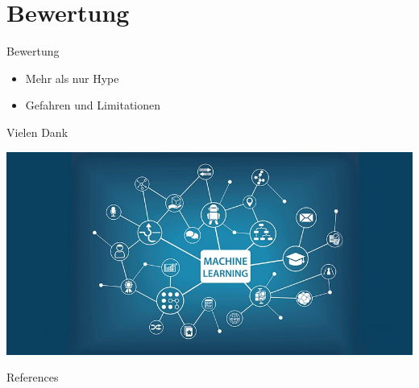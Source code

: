 \documentclass[18pt]{beamer}
\begin{document}
\section{Bewertung}

\begin{frame}{Bewertung}
\begin{itemize}
\item{Mehr als nur Hype}
\item{Gefahren und Limitationen}
\end{itemize}
\end{frame}

\begin{frame}{Vielen Dank}
\begin{center}
\includegraphics[scale=0.35]{images/VielenDank.jpeg}
\cite{Dwivedi2018Jun}
\end{center}
\end{frame}
\appendix
\beginbackup

\begin{frame}[allowframebreaks]{References}
\printbibliography
\end{frame}

\backupend
\end{document}
